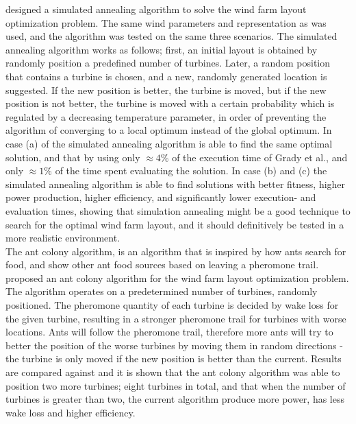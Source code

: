 \noindent \cite{Bilbao} designed a simulated annealing algorithm to solve the wind farm layout optimization problem. The same wind parameters and representation as \cite{Grady} was used, and the algorithm was tested on the same three scenarios. The simulated annealing algorithm works as follows; first, an initial layout is obtained by randomly position a predefined number of turbines. Later, a random position that contains a turbine is chosen, and a new, randomly generated location is suggested. If the new position is better, the turbine is moved, but if the new position is not better, the turbine is moved with a certain probability which is regulated by a decreasing temperature parameter, in order of preventing the algorithm of converging to a local optimum instead of the global optimum. In case (a) of \citep{Grady} the simulated annealing algorithm is able to find the same optimal solution, and that by using only $\approx 4\%$ of the execution time of Grady et al., and only $\approx 1\%$ of the time spent evaluating the solution. In case (b) and (c) the simulated annealing algorithm is able to find solutions with better fitness, higher power production, higher efficiency, and significantly lower execution- and evaluation times, showing that simulation annealing might be a good technique to search for the optimal wind farm layout, and it should definitively be tested in a more realistic environment. \\ 


\noindent The ant colony algorithm, is an algorithm that is inspired by how ants search for food, and show other ant food sources based on leaving a pheromone trail. \cite{Eroglu} proposed an ant colony algorithm for the wind farm layout optimization problem. The algorithm operates on a predetermined number of turbines, randomly positioned. The pheromone quantity of each turbine is decided by wake loss for the given turbine, resulting in a stronger pheromone trail for turbines with worse locations. Ants will follow the pheromone trail, therefore more ants will try to better the position of the worse turbines by moving them in random directions - the turbine is only moved if the new position is better than the current. Results are compared against \citep{Kusiak} and it is shown that the ant colony algorithm was able to position two more turbines; eight turbines in total, and that when the number of turbines is greater than two, the current algorithm produce more power, has less wake loss and higher efficiency.\\


